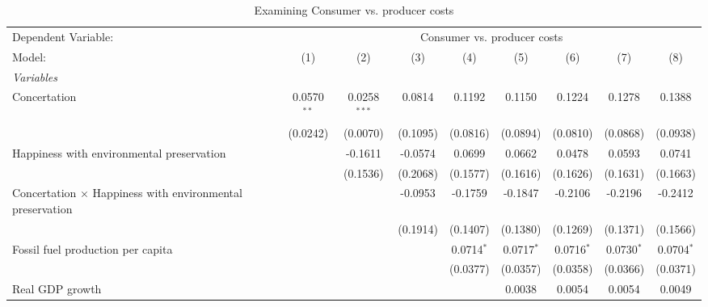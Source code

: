 
\begin{table}[htbp]
   \caption{Examining Consumer vs. producer costs}
   \centering
   \begin{tabular}{lcccccccc}
      \tabularnewline \midrule \midrule
      Dependent Variable: & \multicolumn{8}{c}{Consumer vs. producer costs}\\
      Model:                                                           & (1)           & (2)            & (3)      & (4)          & (5)          & (6)          & (7)           & (8)\\  
      \midrule
      \emph{Variables}\\
      Concertation                                                     & 0.0570$^{**}$ & 0.0258$^{***}$ & 0.0814   & 0.1192       & 0.1150       & 0.1224       & 0.1278        & 0.1388\\   
                                                                       & (0.0242)      & (0.0070)       & (0.1095) & (0.0816)     & (0.0894)     & (0.0810)     & (0.0868)      & (0.0938)\\   
      Happiness with environmental preservation                        &               & -0.1611        & -0.0574  & 0.0699       & 0.0662       & 0.0478       & 0.0593        & 0.0741\\   
                                                                       &               & (0.1536)       & (0.2068) & (0.1577)     & (0.1616)     & (0.1626)     & (0.1631)      & (0.1663)\\   
      Concertation $\times$ Happiness with environmental preservation  &               &                & -0.0953  & -0.1759      & -0.1847      & -0.2106      & -0.2196       & -0.2412\\   
                                                                       &               &                & (0.1914) & (0.1407)     & (0.1380)     & (0.1269)     & (0.1371)      & (0.1566)\\   
      Fossil fuel production per capita                                &               &                &          & 0.0714$^{*}$ & 0.0717$^{*}$ & 0.0716$^{*}$ & 0.0730$^{*}$  & 0.0704$^{*}$\\   
                                                                       &               &                &          & (0.0377)     & (0.0357)     & (0.0358)     & (0.0366)      & (0.0371)\\   
      Real GDP growth                                                  &               &                &          &              & 0.0038       & 0.0054       & 0.0054        & 0.0049\\   

\end{tabular}
\end{table}
